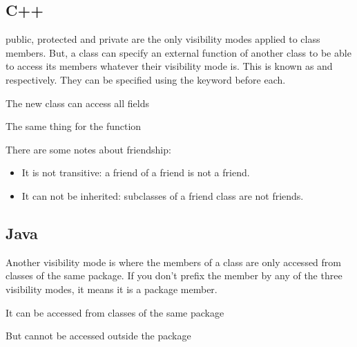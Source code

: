 \documentclass{KodeBook}
\begin{document}
\subsection{C++}

public, protected and private are the only visibility modes applied to class members. 
But, a class can specify an external function of another class to be able to access its members whatever their visibility mode is. 
This is known as  and  respectively. 
They can be specified using the keyword  before each. 



The new class can access all fields 



The same thing for the function



There are some notes about friendship:
\begin{itemize}
	\item It is not transitive: a friend of a friend is not a friend.
	\item It can not be inherited: subclasses of a friend class are not friends.
\end{itemize}

\subsection{Java}

Another visibility mode is  where the members of a class are only accessed from classes of the same package. 
If you don't prefix the member by any of the three visibility modes, it means it is a package member.



It can be accessed from classes of the same package



But cannot be accessed outside the package
\end{document}
